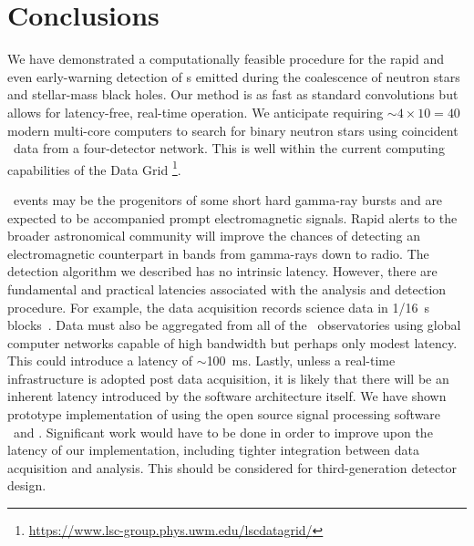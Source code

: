 \section{Conclusions}
\label{sec:conclusions}

We have demonstrated a computationally feasible procedure for the rapid and
even early-warning detection of \GW{}s emitted during the coalescence
of neutron stars and stellar-mass black holes. Our method is as fast as
standard \fft{} convolutions but allows for latency-free, real-time
operation.  We anticipate requiring $\sim 4 \times 10 = 40$ modern multi-core computers to
search for binary neutron stars using coincident \GW\ data from a four-detector network.
This is well within the current computing capabilities of the \LIGO{} Data Grid%
\footnote{\url{https://www.lsc-group.phys.uwm.edu/lscdatagrid/}}.

\CBC\ events may be the progenitors of some short hard gamma-ray bursts and are
expected to be accompanied prompt electromagnetic signals.  Rapid
alerts to the broader astronomical community will improve the chances of
detecting an electromagnetic counterpart in bands from gamma-rays down to
radio.  The detection algorithm we described has no intrinsic latency.  However, there are
fundamental and practical latencies associated with the analysis and detection
procedure. For example, the \LIGO{} data acquisition records science data in 1/16~s
blocks~\citep{Bork2001}. Data must also be aggregated from all of the \GW\
observatories using global computer networks capable of high bandwidth but perhaps only
modest latency.  This could introduce a latency of $\sim$100~ms.  Lastly, unless a
real-time infrastructure is adopted post data acquisition, it is likely that there will be 
an inherent latency introduced by the software architecture itself.  We have shown 
prototype implementation of \lloid{} using the open source signal processing software
\gstreamer\ and \gstlal. Significant work would have to be done in order to
improve upon the latency of our implementation, including tighter integration between
data acquisition and analysis. This should be considered for third-generation detector
design.

\begin{comment}
In the future, this
could be improved upon further by conditionally reconstructing the \SNR{} time-series
only during times when a composite detection statistic crosses a
threshold~\citep{svd-compdetstat}.
\end{comment}

